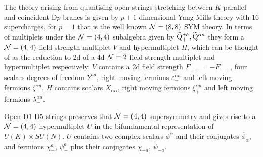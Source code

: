 \documentclass[main.tex]{subfiles}
\begin{document}
The theory arising from quantising open strings stretching between $K$ parallel and coincident D$p$-branes is given by $p+1$ dimensional Yang-Mills theory with $16$ supercharges, for $p=1$ that is the well known $\mathcal{N}=(8,8)$ SYM theory. In terms of multiplets under the $\mathcal{N}=(4,4)$ subalgebra given by $\widetilde{\mathrm{Q}}_{+}^{\dot\alpha \dot a},\widetilde{\mathrm{Q}}_{-}^{\dot\alpha a}$ they form a $\mathcal{N}=(4,4)$ field strength multiplet $V$ and hypermultiplet $H$, which can be thought of as the reduction to 2d of a 4d $\mathcal{N}=2$ field strength multiplet and hypermultiplet respectively. $V$ contains a 2d field strength $F_{-+}=-F_{-+}$, four scalars degrees of freedom $Y^{a\dot a}$, right moving fermions $\varepsilon^{\dot\alpha a}_{+}$ and left moving fermions $\zeta_{-}^{\dot\alpha\dot a}$. $H$ contains scalars $X_{\alpha\dot\alpha}$, right moving fermions $\xi_{+}^{\alpha\dot a}$ and left moving fermions $\lambda^{\alpha a}_{-}$. 

Open D$1$-D$5$ strings preserves that $\mathcal{N}=(4,4)$ supersymmetry and gives rise to a $\mathcal{N}=(4,4)$ hypermultiplet $U$ in the bifundamental representation of $U(K)\times SU(N)$. $U$ contains two complex scalars $\phi^{\dot\alpha}$ and their conjugates $\overline{\phi}_{\dot\alpha}$, and fermions $\chi^{\dot a}_{+}$, $\psi^{a}_{-}$ plus their conjugates $\overline{\chi}_{+\dot{a}}$, $\overline{\psi}_{-a}$.
\end{document}
